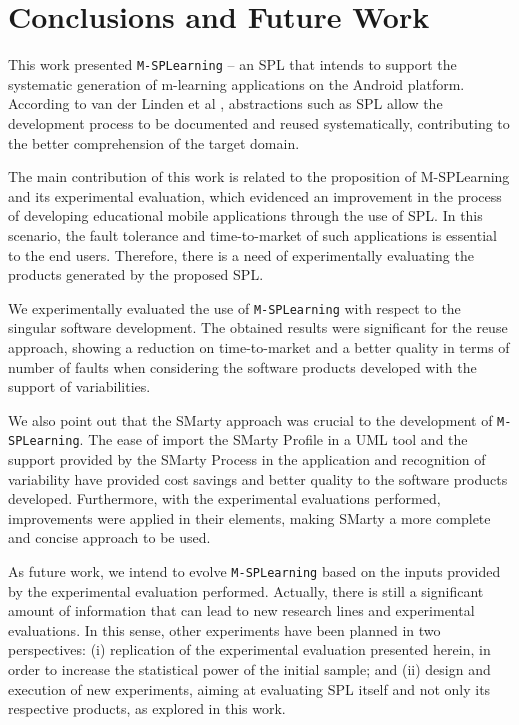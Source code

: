 \section{Conclusions and Future Work}\label{section6}
 
This work presented \texttt{M-SPLear\allowbreak ning} -- an SPL that intends to support the systematic generation of m-learning applications on the Android platform. According to van der Linden et al \cite{vanderlinden07}, abstractions such as SPL allow the development process to be documented and reused systematically, contributing to the better comprehension of the target domain.

The main contribution of this work is related to the proposition of M-SPLearning and its experimental evaluation, which evidenced an improvement in the process of developing educational mobile applications through the use of SPL. In this scenario, the fault tolerance and time-to-market of such applications is essential to the end users. Therefore, there is a need of experimentally evaluating the products generated by the proposed SPL.

We experimentally evaluated the use of \texttt{M-SPLear\allowbreak ning} with respect to the singular software development. The obtained results were significant for the reuse approach, showing a reduction on time-to-market and a better quality in terms of number of faults when considering the software products developed with the support of variabilities. 

We also point out that the SMarty approach was crucial to the development of \texttt{M-SPLear\allowbreak ning}. The ease of import the SMarty Profile in a UML tool and the support provided by the SMarty Process in the application and recognition of variability have provided cost savings and better quality to the software products developed. Furthermore, with the experimental evaluations performed, improvements were applied in their elements, making SMarty a more complete and concise approach to be used.

As future work, we intend to evolve \texttt{M-SPLear\allowbreak ning} based on the inputs provided by the experimental evaluation performed. Actually, there is still a significant amount of information that can lead to new research lines and experimental evaluations. In this sense, other experiments have been planned in two perspectives: (i) replication of the experimental evaluation presented herein, in order to increase the statistical power of the initial sample; and (ii) design and execution of new experiments, aiming at evaluating SPL itself and not only its respective products, as explored in this work.

